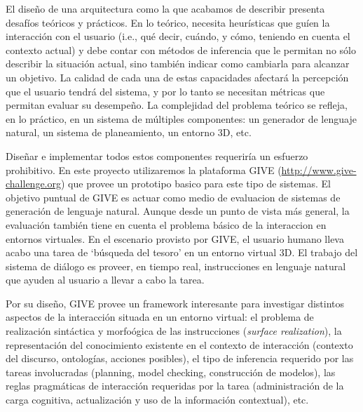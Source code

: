 El dise\~no de una arquitectura como la que acabamos de describir presenta
desaf\'ios te\'oricos y pr\'acticos.  En lo te\'orico, necesita
heur\'isticas que gu\'ien la interacci\'on con el usuario (i.e., qu\'e decir,
cu\'ando, y c\'omo, teniendo en cuenta el contexto actual) y debe contar con m\'etodos
de inferencia que le permitan no s\'olo describir la situaci\'on actual, sino
tambi\'en indicar como cambiarla para alcanzar un objetivo.
La calidad de cada una de estas capacidades afectar\'a la percepci\'on que
el usuario tendr\'a del sistema, y por lo tanto se necesitan m\'etricas que
permitan evaluar su desempe\~no.  La complejidad del problema te\'orico se
refleja, en lo pr\'actico, en un sistema de m\'ultiples componentes: un
generador de lenguaje natural, un sistema de planeamiento, un entorno 3D, etc.

Dise\~nar e implementar todos estos componentes requerir\'ia un esfuerzo prohibitivo.
En este proyecto utilizaremos la plataforma GIVE (\url{http://www.give-challenge.org}) que
provee un prototipo basico para este tipo de sistemas.
El objetivo puntual
de GIVE es actuar como medio de evaluacion de sistemas de generaci\'on
de lenguaje natural. Aunque desde un punto de vista m\'as general, la evaluaci\'on
tambi\'en tiene en cuenta el problema b\'asico de la interaccion en
entornos virtuales.  En el escenario provisto por GIVE, el usuario
humano lleva acabo una tarea de `b\'usqueda del tesoro' en un entorno
virtual 3D.  El trabajo del sistema de di\'alogo es proveer, en tiempo
real, instrucciones en lenguaje natural que ayuden al usuario
a llevar a cabo la tarea.


Por su dise\~no, GIVE provee un framework interesante para investigar
distintos aspectos de la interacci\'on situada en un entorno virtual:
el problema de realizaci\'on sint\'actica y morfo\'ogica de las
instrucciones (\emph{surface realization}),
la representaci\'on del conocimiento existente en el contexto de
interacci\'on (contexto del discurso, ontolog\'ias, acciones posibles),
el tipo de inferencia requerido por las tareas involucradas
(planning, model checking, construcci\'on de modelos),
las reglas pragm\'aticas de interacci\'on requeridas por la tarea
(administraci\'on de la carga cognitiva, actualizaci\'on y uso de la informaci\'on contextual), etc.

